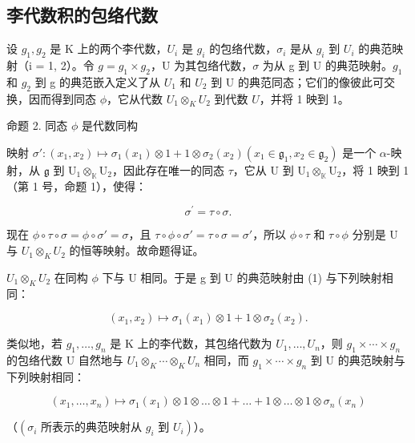 \subsection{李代数积的包络代数}

设 \(g_{1}, g_{2}\) 是 K 上的两个李代数，\(U_{i}\) 是 \(g_{i}\) 的包络代数，\(\sigma_{i}\) 是从 \(g_{i}\) 到 \(U_{i}\) 的典范映射（i = 1, 2）。令 \(g = g_{1} \times g_{2}\)，U 为其包络代数，\(\sigma\) 为从 g 到 U 的典范映射。\(g_{1}\) 和 \(g_{2}\) 到 g 的典范嵌入定义了从 \(U_{1}\) 和 \(U_{2}\) 到 U 的典范同态；它们的像彼此可交换，因而得到同态 \(\phi\)，它从代数 \(U_1 \otimes_K U_2\) 到代数 \(U\)，并将 1 映到 1。

命题 2. 同态 \(\phi\) 是代数同构

映射 \(\sigma': (x_1, x_2) \mapsto \sigma_1(x_1) \otimes 1 + 1 \otimes \sigma_2(x_2) (x_1 \in \mathfrak{g}_1, x_2 \in \mathfrak{g}_2)\) 是一个 \(\alpha\)-映射，从 \(\mathfrak{g}\) 到 \(\mathrm{U}_1 \otimes_{\mathbb{K}} \mathrm{U}_2\)，因此存在唯一的同态 \(\tau\)，它从 \(\mathrm{U}\) 到 \(\mathrm{U}_1 \otimes_{\mathbb{K}} \mathrm{U}_2\)，将 1 映到 1（第 1 号，命题 1），使得：

\[
\sigma^ {\prime} = \tau \circ \sigma .\tag{1}
\]

现在 \(\phi \circ \tau \circ \sigma = \phi \circ \sigma' = \sigma\)，且 \(\tau \circ \phi \circ \sigma' = \tau \circ \sigma = \sigma'\)，所以 \(\phi \circ \tau\) 和 \(\tau \circ \phi\) 分别是 U 与 \(U_1 \otimes_K U_2\) 的恒等映射。故命题得证。

\(U_{1} \otimes_{K} U_{2}\) 在同构 \(\phi\) 下与 U 相同。于是 g 到 U 的典范映射由 (1) 与下列映射相同：

\[
(x _ {1}, x _ {2}) \mapsto \sigma_ {1} (x _ {1}) \otimes 1 + 1 \otimes \sigma_ {2} (x _ {2}).
\]

类似地，若 \(g_{1},\ldots,g_{n}\) 是 K 上的李代数，其包络代数为 \(U_{1},\ldots,U_{n}\)，则 \(g_{1}\times\cdots\times g_{n}\) 的包络代数 U 自然地与 \(U_{1}\otimes_{K}\cdots\otimes_{K}U_{n}\) 相同，而 \(g_{1}\times\cdots\times g_{n}\) 到 U 的典范映射与下列映射相同：

\[
(x _ {1}, \dots , x _ {n}) \mapsto \sigma_ {1} (x _ {1}) \otimes 1 \otimes \dots \otimes 1 + \dots + 1 \otimes \dots \otimes 1 \otimes \sigma_ {n} (x _ {n})
\]

（\((\sigma_{i} \text{ 所表示的典范映射从 } g_{i} \text{ 到 } U_{i})\)）。

